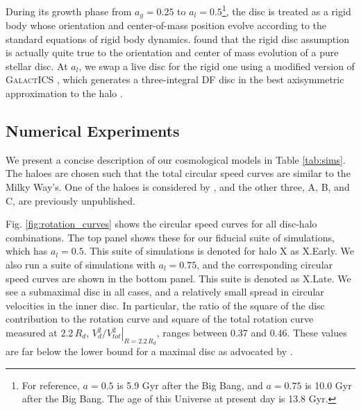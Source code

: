 
During its growth phase from $a_g=0.25$ to $a_l=0.5$\footnote{For reference, $a=0.5$ is 5.9 Gyr after the Big Bang, and $a=0.75$ is 10.0 Gyr after the Big Bang. The age of this Universe at present day is 13.8 Gyr.}, the disc is treated
as a rigid body whose orientation and center-of-mass position evolve
according to the standard equations of rigid body dynamics. \citet{bauer2018a} found that
the rigid disc assumption is actually quite true to the orientation
and center of mass evolution of a pure stellar disc. At
$a_l$, we swap a live disc for the rigid one using a modified version of
\textsc{GalactICS} \citep{KGGalactICSReference,WPDGalactICSReference}, which generates a
three-integral DF disc in the best axisymmetric approximation to the
halo \citet{bauer2018a}.


\subsection{Numerical Experiments} \label{ssec:numerical_experiments}


We present a concise description of our cosmological models in Table \ref{tab:sims}. The haloes are chosen such that the total circular speed curves are similar to the Milky Way's. One of the haloes is considered by \cite{bauer2018b}, and the other three, A, B, and C, are previously unpublished.
 
Fig. \ref{fig:rotation_curves} shows the circular speed curves for all disc-halo combinations. The top panel shows these for our fiducial suite of simulations, which has $a_l=0.5$. This suite of simulations is denoted for halo X as X.Early. We also run a suite of simulations with $a_l=0.75$, and the corresponding circular speed curves are shown in the bottom panel. This suite is denoted as X.Late. We see a submaximal disc in all cases, and a relatively small spread in circular velocities in the inner disc. In particular, the ratio of the square of the disc contribution to the rotation curve and square of the total rotation curve measured at $2.2\, R_d$, $\left. V_d^2/V_{tot}^2 \right \vert_{R=2.2\,R_d}$, ranges between 0.37 and 0.46. These values are far below the lower bound for a maximal disc as advocated by \citet{sackett_1997}. 

